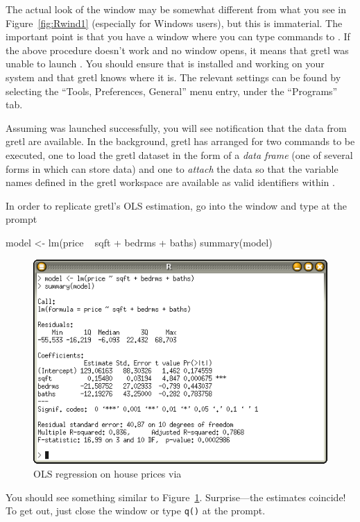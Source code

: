 The actual look of the  window may be somewhat different from
what you see in Figure~\ref{fig:Rwind1} (especially for Windows
users), but this is immaterial. The important point is that you have a
window where you can type commands to . If the above procedure
doesn't work and no  window opens, it means that gretl
was unable to launch .  You should ensure that  is
installed and working on your system and that gretl knows where
it is. The relevant settings can be found by selecting the ``Tools,
Preferences, General'' menu entry, under the ``Programs'' tab.

Assuming  was launched successfully, you will see notification
that the data from gretl are available.  In the background,
gretl has arranged for two  commands to be executed, one
to load the gretl dataset in the form of a \emph{data frame}
(one of several forms in which  can store data) and one to
\emph{attach} the data so that the variable names defined in the
gretl workspace are available as valid identifiers within
.

In order to replicate gretl's OLS estimation, go into the 
window and type at the prompt
\begin{code}
  model <- lm(price ~ sqft + bedrms + baths)
  summary(model)
\end{code}

\begin{figure}[htbp]
  \centering
  \includegraphics[scale=0.7]{figures/Rwindow-2}
  \caption{OLS regression on house prices via }
  \label{fig:Rwind2}
\end{figure}

You should see something similar to
Figure~\ref{fig:Rwind2}. Surprise---the estimates coincide! To get
out, just close the  window or type \verb|q()| at the 
prompt.

